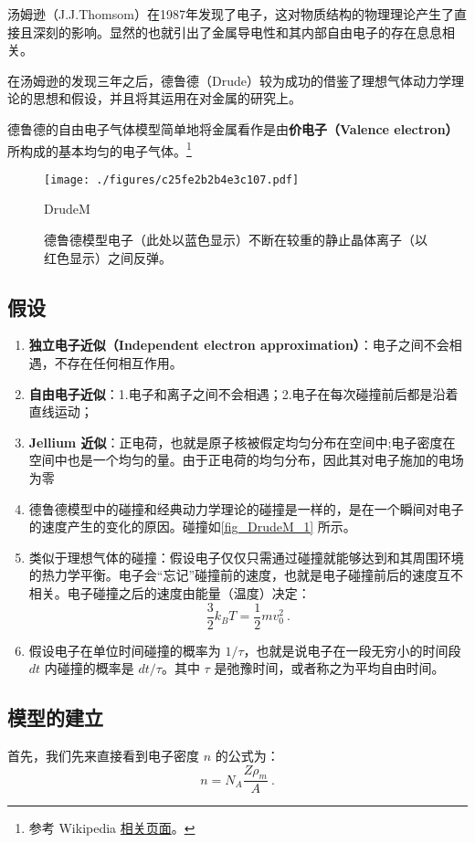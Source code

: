 
汤姆逊（J.J.Thomsom）在1987年发现了电子，这对物质结构的物理理论产生了直接且深刻的影响。显然的也就引出了金属导电性和其内部自由电子的存在息息相关。

在汤姆逊的发现三年之后，德鲁德（Drude）较为成功的借鉴了理想气体动力学理论的思想和假设，并且将其运用在对金属的研究上。

德鲁德的自由电子气体模型简单地将金属看作是由\textbf{价电子（Valence electron）}所构成的基本均匀的电子气体。\footnote{参考 Wikipedia \href{https://en.wikipedia.org/wiki/Drude_model}{相关页面}。}
\begin{figure}[ht]
\centering
\texttt{[image: ./figures/c25fe2b2b4e3c107.pdf]}
\caption{德鲁德模型电子（此处以蓝色显示）不断在较重的静止晶体离子（以红色显示）之间反弹。} \label{fig_DrudeM_1}DrudeM
\end{figure}
\subsection{假设}
\begin{enumerate}
\item \textbf{独立电子近似（Independent electron approximation）}：电子之间不会相遇，不存在任何相互作用。
\item \textbf{自由电子近似}：1.电子和离子之间不会相遇；2.电子在每次碰撞前后都是沿着直线运动；
\item \textbf{Jellium 近似}：正电荷，也就是原子核被假定均匀分布在空间中;电子密度在空间中也是一个均匀的量。由于正电荷的均匀分布，因此其对电子施加的电场为零
\item 德鲁德模型中的碰撞和经典动力学理论的碰撞是一样的，是在一个瞬间对电子的速度产生的变化的原因。碰撞如\autoref{fig_DrudeM_1} 所示。
\item 类似于理想气体的碰撞：假设电子仅仅只需通过碰撞就能够达到和其周围环境的热力学平衡。电子会“忘记”碰撞前的速度，也就是电子碰撞前后的速度互不相关。电子碰撞之后的速度由能量（温度）决定：
\begin{equation}\label{eq_DrudeM_7}
\frac{3}{2}k_BT = \frac{1}{2}mv_0^2~.
\end{equation}
\item 假设电子在单位时间碰撞的概率为 $1/\tau $，也就是说电子在一段无穷小的时间段 $dt$ 内碰撞的概率是 $dt/\tau$。其中 $\tau$ 是弛豫时间，或者称之为平均自由时间。
\end{enumerate}
\subsection{模型的建立}
首先，我们先来直接看到电子密度 $n$ 的公式为：
\begin{equation}
n=N_A\frac{Z\rho_m}{A}~.
\end{equation}

